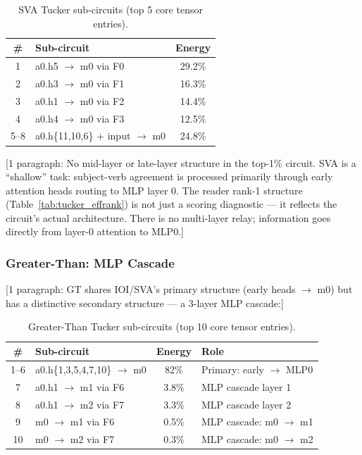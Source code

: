 \documentclass[11pt]{article}
\begin{document}
\begin{table}[h]
\centering
\caption{SVA Tucker sub-circuits (top 5 core tensor entries).}
\label{tab:sva_subcircuits}
\begin{tabular}{clc}
\toprule
\textbf{\#} & \textbf{Sub-circuit} & \textbf{Energy} \\
\midrule
1 & a0.h5 $\to$ m0 via F0 & 29.2\% \\
2 & a0.h3 $\to$ m0 via F1 & 16.3\% \\
3 & a0.h1 $\to$ m0 via F2 & 14.4\% \\
4 & a0.h4 $\to$ m0 via F3 & 12.5\% \\
5--8 & a0.h\{11,10,6\} + input $\to$ m0 & 24.8\% \\
\bottomrule
\end{tabular}
\end{table}

[1 paragraph: No mid-layer or late-layer structure in the top-1\%
circuit. SVA is a ``shallow'' task: subject-verb agreement is processed
primarily through early attention heads routing to MLP layer 0. The
reader rank-1 structure (Table~\ref{tab:tucker_effrank}) is not just a
scoring diagnostic --- it reflects the circuit's actual architecture.
There is no multi-layer relay; information goes directly from layer-0
attention to MLP0.]

\subsubsection{Greater-Than: MLP Cascade}


[1 paragraph: GT shares IOI/SVA's primary structure (early heads $\to$
m0) but has a distinctive secondary structure --- a 3-layer MLP cascade:]

\begin{table}[h]
\centering
\caption{Greater-Than Tucker sub-circuits (top 10 core tensor entries).}
\label{tab:gt_subcircuits}
\begin{tabular}{clcl}
\toprule
\textbf{\#} & \textbf{Sub-circuit} & \textbf{Energy} & \textbf{Role} \\
\midrule
1--6 & a0.h\{1,3,5,4,7,10\} $\to$ m0 & 82\% & Primary: early $\to$ MLP0 \\
7 & a0.h1 $\to$ m1 via F6 & 3.8\% & MLP cascade layer 1 \\
8 & a0.h1 $\to$ m2 via F7 & 3.3\% & MLP cascade layer 2 \\
9 & m0 $\to$ m1 via F6 & 0.5\% & MLP cascade: m0 $\to$ m1 \\
10 & m0 $\to$ m2 via F7 & 0.3\% & MLP cascade: m0 $\to$ m2 \\
\bottomrule
\end{tabular}
\end{table}
\end{document}
